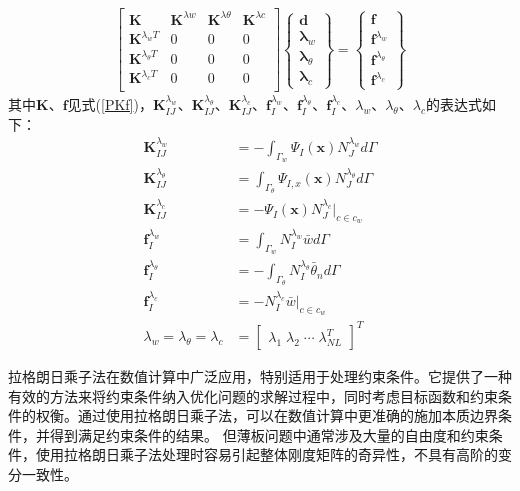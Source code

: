 \begin{equation}
    \begin{split}
     \left[\begin{matrix}\pmb{K}&\pmb{K}^{\lambda w}&\pmb{K}^{\lambda\theta}&\pmb{K}^{\lambda c}\\
     \pmb{K}^{\lambda_wT}&0&0&0\\
     \pmb{K}^{\lambda_\theta T}&0&0&0\\
     \pmb{K}^{\lambda_c T}&0&0&0\\
     \end{matrix}\right]
     \left\{\begin{matrix}
     \pmb{d}\\\pmb \lambda_w\\\pmb \lambda_{\theta}\\\pmb\lambda_c
     \end{matrix}\right\}=
     \left\{\begin{matrix}
     \pmb{f}\\\pmb f^{\lambda_w}\\\pmb f^{\lambda_\theta}\\\pmb f^{\lambda_c}
     \end{matrix}\right\}
\end{split}
\end{equation}
其中$\pmb{K}$、$\pmb{f}$见式(\ref{PKf})，$\pmb K_{I\!J}^{\lambda_w}$、$\pmb K_{I\!J}^{\lambda_\theta}$、$\pmb K_{I\!J}^{\lambda_c}$、$\pmb f_I^{\lambda_w}$、$\pmb f_I^{\lambda_\theta}$、$\pmb f_I^{\lambda_c}$、$\lambda_w$、$\lambda_\theta$、$\lambda_c$的表达式如下：
\begin{subequations}
    \begin{align}
    \pmb K_{I\!J}^{\lambda_w}&=-\int_{\Gamma_w}\Psi_I(\pmb{x})N_J^{\lambda_w}d\Gamma\\
    \pmb K_{I\!J}^{\lambda_\theta}&=\int_{\Gamma_\theta}\Psi_{I,x}(\pmb{x})N_J^{\lambda_\theta}d\Gamma\\
    \pmb K_{I\!J}^{\lambda_c}&=-\Psi_I(\pmb{x})N_J^{\lambda_c}\vert_{c\in c_w}\\
    \pmb f_I^{\lambda_w}&=\int_{\Gamma_w}N_I^{\lambda_w}\bar{w}d\Gamma\\
    \pmb f_I^{\lambda_\theta}&=-\int_{\Gamma_\theta}N_I^{\lambda_\theta}\bar{\theta}_nd\Gamma\\
    \pmb f_I^{\lambda_c}&=-N_I^{\lambda_c}\bar{w}\vert_{c\in c_w}\\
    \lambda_w=\lambda_\theta=\lambda_c&=\left[\begin{matrix}\lambda_1\;\lambda_2\;\dotsb\;\lambda_{N\!L}^T\end{matrix}\right]^T
   \end{align}
\end{subequations}\par
拉格朗日乘子法在数值计算中广泛应用，特别适用于处理约束条件。它提供了一种有效的方法来将约束条件纳入优化问题的求解过程中，同时考虑目标函数和约束条件的权衡。通过使用拉格朗日乘子法，可以在数值计算中更准确的施加本质边界条件，并得到满足约束条件的结果。
但薄板问题中通常涉及大量的自由度和约束条件，使用拉格朗日乘子法处理时容易引起整体刚度矩阵的奇异性，不具有高阶的变分一致性。
